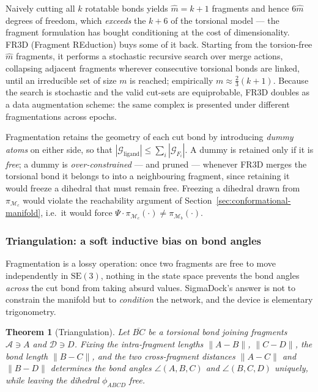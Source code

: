 \documentclass[a4paper,12pt]{article}
\newtheorem{theorem}{Theorem}[section]
\theoremstyle{remark}
\begin{document}
Naively cutting all $k$ rotatable bonds yields $\hat{m} = k+1$ fragments and hence $6\hat{m}$
degrees of freedom, which \emph{exceeds} the $k+6$ of the torsional model --- the fragment
formulation has bought conditioning at the cost of dimensionality. FR3D (Fragment REduction) buys
some of it back. Starting from the torsion-free $\hat{m}$ fragments, it performs a stochastic
recursive search over merge actions, collapsing adjacent fragments wherever consecutive torsional
bonds are linked, until an irreducible set of size $m$ is reached; empirically $m \approx \tfrac{2}{3}(k+1)$.
Because the search is stochastic and the valid cut-sets are equiprobable, FR3D doubles as a data
augmentation scheme: the same complex is presented under different fragmentations across epochs.

Fragmentation retains the geometry of each cut bond by introducing \emph{dummy atoms} on either
side, so that $|\mathcal{G}_{\text{ligand}}| \leq \sum_i |\mathcal{G}_{F_i}|$. A dummy is retained
only if it is \emph{free}; a dummy is \emph{over-constrained} --- and pruned --- whenever FR3D merges
the torsional bond it belongs to into a neighbouring fragment, since retaining it would freeze a
dihedral that must remain free. Freezing a dihedral drawn from $\pi_{\mathcal{M}_c}$ would violate
the reachability argument of Section~\ref{sec:conformational-manifold}, i.e.\ it would force
$\Psi \cdot \pi_{\mathcal{M}_c}(\cdot) \neq \pi_{\mathcal{M}_b}(\cdot)$.

\subsubsection{Triangulation: a soft inductive bias on bond angles}
\label{sec:triangulation}

Fragmentation is a lossy operation: once two fragments are free to move independently in
$\mathrm{SE}(3)$, nothing in the state space prevents the bond angles \emph{across} the cut bond from
taking absurd values. SigmaDock's answer is not to constrain the manifold but to \emph{condition}
the network, and the device is elementary trigonometry.

\begin{theorem}[Triangulation]
\label{lem:triangulation}
Let $\overline{BC}$ be a torsional bond joining fragments $\mathcal{A} \ni A$ and $\mathcal{D} \ni D$.
Fixing the intra-fragment lengths $\|A-B\|$, $\|C-D\|$, the bond length $\|B-C\|$, and the two
\emph{cross-fragment} distances $\|A-C\|$ and $\|B-D\|$ determines the bond angles
$\angle(A,B,C)$ and $\angle(B,C,D)$ uniquely, while leaving the dihedral $\phi_{ABCD}$ free.
\end{theorem}
\end{document}
